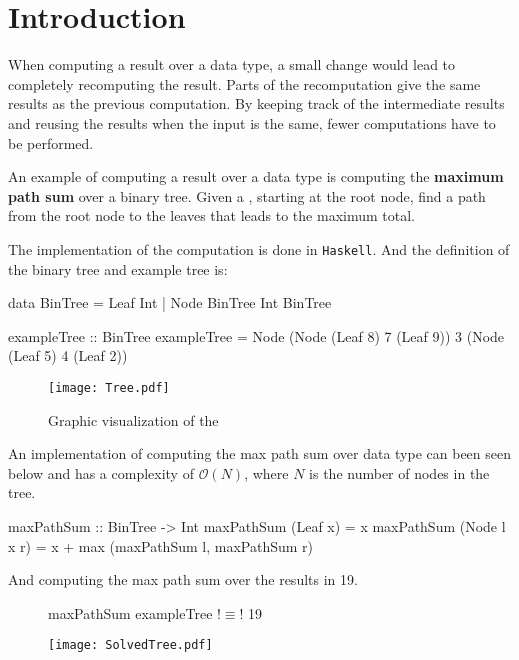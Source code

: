 \newpage
\section{Introduction}
When computing a result over a data type, a small change would lead to completely recomputing the result. Parts of the recomputation give the same results as the previous computation. By keeping track of the intermediate results and reusing the results when the input is the same, fewer computations have to be performed. 

An example of computing a result over a data type is computing the \textbf{maximum path sum} over a binary tree. Given a , starting at the root node, find a path from the root node to the leaves that leads to the maximum total.

The implementation of the computation is done in \texttt{Haskell}. And the definition of the binary tree and example tree is:
\begin{haskell}
data BinTree = Leaf Int
             | Node BinTree Int BinTree 
\end{haskell}

\begin{haskell}
exampleTree :: BinTree    
exampleTree = Node (Node (Leaf 8) 7 (Leaf 9)) 3 (Node (Leaf 5) 4 (Leaf 2))
\end{haskell}

\begin{figure}[H]
    \centering
    \texttt{[image: Tree.pdf]}
    \caption{Graphic visualization of the }
\end{figure}

An implementation of computing the max path sum over data type  can been seen below and has a complexity of $\mathcal{O}(N)$, where $N$ is the number of nodes in the tree.
\begin{haskell}
maxPathSum :: BinTree -> Int
maxPathSum (Leaf x)     = x
maxPathSum (Node l x r) = x + max (maxPathSum l, maxPathSum r)
\end{haskell}

\newpage
And computing the max path sum over the  results in 19.

\begin{figure}[H]
\begin{minipage}[c]{0.35\textwidth}
\begin{haskell}
maxPathSum exampleTree !$\equiv$! 19
\end{haskell}
\end{minipage}
\hspace{0.1\textwidth}
\begin{minipage}[c]{0.55\textwidth}
\texttt{[image: SolvedTree.pdf]}
\end{minipage}
\end{figure}

